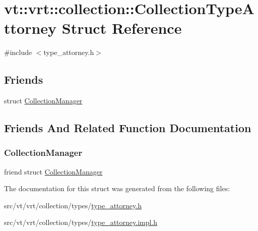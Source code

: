 \hypertarget{structvt_1_1vrt_1_1collection_1_1_collection_type_attorney}{}\section{vt\+:\+:vrt\+:\+:collection\+:\+:Collection\+Type\+Attorney Struct Reference}
\label{structvt_1_1vrt_1_1collection_1_1_collection_type_attorney}


{\ttfamily \#include $<$type\+\_\+attorney.\+h$>$}

\subsection*{Friends}
\begin{DoxyCompactItemize}
\item 
struct \hyperlink{structvt_1_1vrt_1_1collection_1_1_collection_type_attorney_af9288b1963f434a90b307b5305a49510}{Collection\+Manager}
\end{DoxyCompactItemize}


\subsection{Friends And Related Function Documentation}
\mbox{\label{structvt_1_1vrt_1_1collection_1_1_collection_type_attorney_af9288b1963f434a90b307b5305a49510}} 
\subsubsection{\texorpdfstring{Collection\+Manager}{CollectionManager}}
{\footnotesize\ttfamily friend struct \hyperlink{structvt_1_1vrt_1_1collection_1_1_collection_manager}{Collection\+Manager}\hspace{0.3cm}{\ttfamily [friend]}}



The documentation for this struct was generated from the following files\+:\begin{DoxyCompactItemize}
\item 
src/vt/vrt/collection/types/\hyperlink{type__attorney_8h}{type\+\_\+attorney.\+h}\item 
src/vt/vrt/collection/types/\hyperlink{type__attorney_8impl_8h}{type\+\_\+attorney.\+impl.\+h}\end{DoxyCompactItemize}

